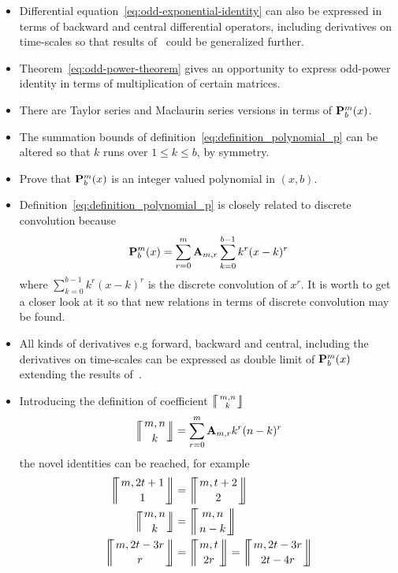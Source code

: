 \begin{itemize}
    \item Differential equation~\eqref{eq:odd-exponential-identity} can also be expressed in terms of backward
    and central differential operators, including derivatives on time-scales so that results of~\cite{kolosov2016study}
    could be generalized further.
    \item Theorem~\eqref{eq:odd-power-theorem} gives an opportunity to express odd-power identity
    in terms of multiplication of certain matrices.
    \item There are Taylor series and Maclaurin series versions in terms of ${\mathbf{P}}\sp{m} \sb{b}(x)$.
    \item The summation bounds of definition~\eqref{eq:definition_polynomial_p} can be altered so that
    $k$ runs over $1 \leq k \leq b$, by symmetry.
    \item Prove that ${\mathbf{P}}\sp{m} \sb{b}(x)$ is an integer valued polynomial in $(x,b)$.
    \item Definition~\eqref{eq:definition_polynomial_p} is closely related to discrete convolution because
    \begin{equation*}
        {\mathbf{P}}\sp{m} \sb{b}(x) = \sum_{r=0}^{m} {\mathbf{A}} \sb{m,r} \sum_{k=0}^{b-1} k^r(x-k)^r
    \end{equation*}
    where $\sum_{k=0}^{b-1} k^r(x-k)^r$ is the discrete convolution of $x^r$.
    It is worth to get a closer look at it so that new relations in terms of discrete convolution may be found.
    \item All kinds of derivatives e.g forward, backward and central, including the derivatives on time-scales can be expressed
    as double limit of ${\mathbf{P}}\sp{m} \sb{b}(x)$ extending the results of~\cite{kolosov_2024_10575485}.
    \item Introducing the definition of coefficient $\llceilCoefficient{m,n}{k}$
    \begin{equation*}
        \llceilCoefficient{m,n}{k} = \sum_{r=0}^{m} \coeffA{m}{r} k^r (n-k)^r
    \end{equation*}
    the novel identities can be reached, for example
    \begin{align*}
        \llceilCoefficient{m, 2t+1}{1} &= \llceilCoefficient{m, t+2}{2} \\
        \llceilCoefficient{m, n}{k} &= \llceilCoefficient{m, n}{n-k} \\
        \llceilCoefficient{m, 2t-3r}{r} &= \llceilCoefficient{m, t}{2r} = \llceilCoefficient{m, 2t-3r}{2t-4r}

\end{align*}
\end{itemize}
